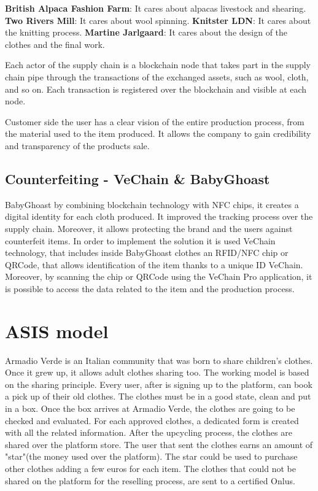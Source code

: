 \begin{outline}
    \1 \textbf{British Alpaca Fashion Farm}: It cares about alpacas livestock and shearing.
    \1 \textbf{Two Rivers Mill}: It cares about wool spinning.
    \1 \textbf{Knitster LDN}: It cares about the knitting process.
    \1 \textbf{Martine Jarlgaard}: It cares about the design of the clothes and the final work.
\end{outline}

Each actor of the supply chain is a blockchain node that takes part in the supply chain pipe through 
the transactions of the exchanged assets, such as wool, cloth, and so on. Each transaction is registered over the 
blockchain and visible at each node. 

Customer side the user has a clear vision of the entire production process, from the material used to the 
item produced. It allows the company to gain credibility and transparency of the products sale. 

\subsection{Counterfeiting - VeChain & BabyGhoast}

BabyGhoast by combining blockchain technology with NFC chips, it creates a digital identity for each cloth 
produced. It improved the tracking process over the supply chain. Moreover, it allows protecting the brand 
and the users against counterfeit items. In order to implement the solution it is used VeChain technology, that includes 
inside BabyGhoast clothes an RFID/NFC chip or QRCode, that allows identification of the item thanks to a 
unique ID VeChain. Moreover, by scanning the chip or QRCode using the VeChain Pro application, it is possible to 
access the data related to the item and the production process. 

\section{ASIS model}

Armadio Verde is an Italian community that was born to share children's clothes. Once it grew up, it allows 
adult clothes sharing too. The working model is based on the sharing principle. Every user, after is signing up 
to the platform, can book a pick up of their old clothes. The clothes must be in a good state, clean and 
put in a box. Once the box arrives at Armadio Verde, the clothes are going to be checked and evaluated. For each 
approved clothes, a dedicated form  is created with all the related information. After the upcycling process, 
the clothes are shared over the platform store. The user that sent the clothes earns an amount of 
"star"(the money used over the platform). The star could be used to purchase other clothes adding a few euros 
for each item. The clothes that could not be shared on the platform for the reselling process, are sent to a 
certified Onlus.

